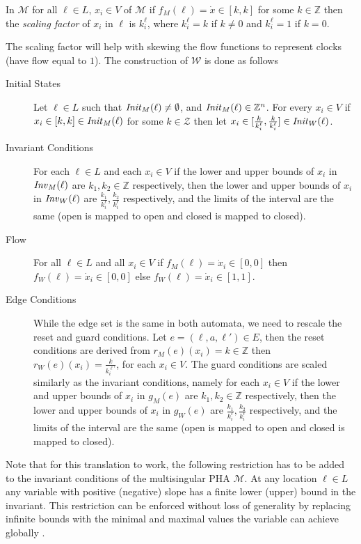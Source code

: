 \begin{defi}
    In $\mathcal{M}$ for all $\ell\in L$, $x_{i}\in V$ of $\mathcal{M}$ if $f_{M}(\ell)=\dot{x}\in[k,k]$ for some $k\in\mathbb{Z}$ then the \emph{scaling factor} of $x_{i}$ in $\ell$ is $k_{i}^{\ell}$, where $k_{i}^{\ell}=k$ if $k\neq0$ and $k_{i}^{\ell}=1$ if $k=0$.
\end{defi}
The scaling factor will help with skewing the flow functions to represent clocks (have flow equal to $1$). The construction of $\mathcal{W}$ is done as follows
\begin{description}
    \item[Initial States] Let $\ell\in L$ such that $\mathit{Init}_{M}(\ell)\neq\emptyset$, and $\mathit{Init}_{M}(\ell)\in\mathbb{Z}^{n}$. For every $x_{i}\in V$ if $x_{i}\in[k,k]\in \mathit{Init}_{M}(\ell)$ for some $k\in\mathcal{Z}$ then let
    $x_{i}\in[\frac{k}{k_{i}^{\ell}},\frac{k}{k_{i}^{\ell}}]\in \mathit{Init}_{W}(\ell)$.
    \item[Invariant Conditions] For each $\ell\in L$ and each $x_{i}\in V$ if the lower and upper bounds of $x_{i}$ in $\mathit{Inv}_{M}(\ell)$ are $k_{1},k_{2}\in\mathbb{Z}$ respectively, then the lower and upper bounds of $x_{i}$ in $\mathit{Inv}_{W}(\ell)$ are
    $\frac{k_{1}}{k_{i}^{\ell}},\frac{k_{2}}{k_{i}^{\ell}}$ respectively, and the limits of the interval are the same (open is mapped to open and closed is mapped to closed).
    \item[Flow] For all $\ell\in L$ and all $x_{i}\in V$ if $f_{M}(\ell)=\dot{x}_{i}\in[0,0]$ then $f_{W}(\ell)=\dot{x}_{i}\in[0,0]$ else $f_{W}(\ell)=\dot{x}_{i}\in[1,1]$.
    \item[Edge Conditions] While the edge set is the same in both automata, we need to rescale the reset and guard conditions. Let $e=(\ell,a,\ell')\in E$, then the reset conditions are derived from $r_{M}(e)(x_{i})=k\in\mathbb{Z}$ then $r_{W}(e)(x_{i})= \frac{k}{k_{i}^{\ell'}}$, for each $x_{i}\in V$. The guard conditions are scaled similarly as the invariant conditions, namely for each $x_{i}\in V$ if the lower and upper bounds of
    $x_{i}$ in $g_{M}(e)$ are $k_{1},k_{2}\in\mathbb{Z}$ respectively, then the lower and upper bounds of $x_{i}$ in $g_{W}(e)$ are $\frac{k_{1}}{k_{i}^{\ell}},\frac{k_{2}}{k_{i}^{\ell}}$ respectively, and the limits of the interval are the same (open is mapped to open and closed is mapped to closed).
\end{description}

Note that for this translation to work, the following restriction has to be added to the invariant conditions of the multisingular PHA $\mathcal{M}$. At any location $\ell\in L$ any variable with positive (negative) slope has a finite lower (upper) bound in the invariant. This restriction can be enforced without loss of generality by replacing infinite bounds with the minimal and maximal values the variable can achieve globally \cite{Olivero1994}.

